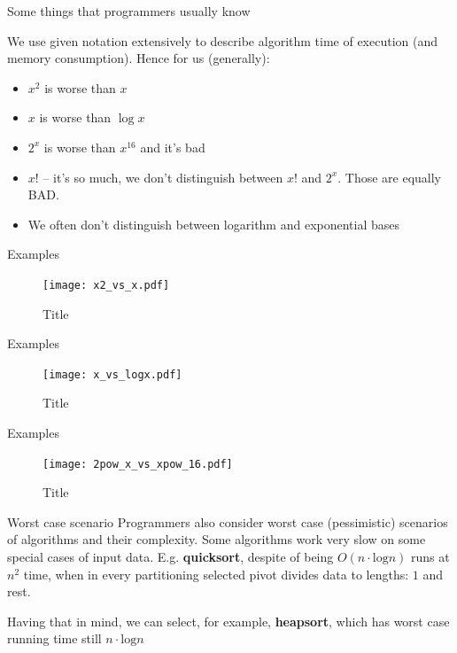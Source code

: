 \documentclass{beamer}
\begin{document}
\begin{frame}{Some things that programmers usually know}

We use given notation extensively to describe algorithm time of execution (and memory consumption). Hence for us (generally):

\begin{itemize}
	\item $x^2$ is worse than $x$
    \item $x$ is worse than $\log x$
    \item $2^x$ is worse than $x^{16}$ and it's bad
    \item $x!$ -- it's so much, we don't distinguish between $x!$ and $2^x$. Those are equally BAD.
    \item We often don't distinguish between logarithm and exponential bases
\end{itemize}

\end{frame}

\begin{frame}{Examples}
    \begin{figure}[htbp]
    \centering
        \texttt{[image: x2\_vs\_x.pdf]}
    \caption{Title}
    \label{fig:x2_vs_x}
    \end{figure}
\end{frame}

\begin{frame}{Examples}
    \begin{figure}[htbp]
    \centering
        \texttt{[image: x\_vs\_logx.pdf]}
    \caption{Title}
    \label{fig:x_vs_logx}
    \end{figure}
\end{frame}

\begin{frame}{Examples}
    \begin{figure}[htbp]
    \centering
        \texttt{[image: 2pow\_x\_vs\_xpow\_16.pdf]}
    \caption{Title}
    \label{fig:2powx_vs_xpow16}
    \end{figure}
\end{frame}

\begin{frame}{Worst case scenario}
Programmers also consider worst case (pessimistic) scenarios of algorithms and their complexity. Some algorithms work very slow on some special cases of input data. E.g. \textbf{quicksort}, despite of being $O(n\cdot\textrm{log}n)$ runs at $n^2$ time, when in every partitioning selected pivot divides data to lengths: $1$ and rest.

Having that in mind, we can select, for example, \textbf{heapsort}, which has worst case running time still $n\cdot\textrm{log}n$
\end{frame}
\end{document}
